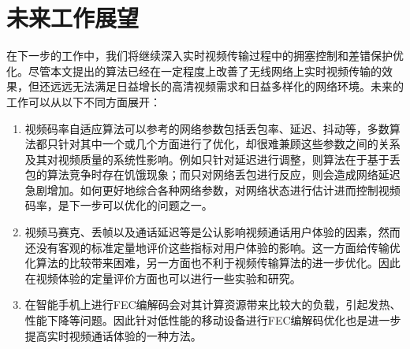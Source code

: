 \section{未来工作展望}
在下一步的工作中，我们将继续深入实时视频传输过程中的拥塞控制和差错保护优化。尽管本文提出的算法已经在一定程度上改善了无线网络上实时视频传输的效果，但还远远无法满足日益增长的高清视频需求和日益多样化的网络环境。未来的工作可以从以下不同方面展开：
\begin{enumerate}
    \item 视频码率自适应算法可以参考的网络参数包括丢包率、延迟、抖动等，多数算法都只针对其中一个或几个方面进行了优化，却很难兼顾这些参数之间的关系及其对视频质量的系统性影响。例如只针对延迟进行调整，则算法在于基于丢包的算法竞争时存在饥饿现象；而只对网络丢包进行反应，则会造成网络延迟急剧增加。如何更好地综合各种网络参数，对网络状态进行估计进而控制视频码率，是下一步可以优化的问题之一。
    \item 视频马赛克、丢帧以及通话延迟等是公认影响视频通话用户体验的因素，然而还没有客观的标准定量地评价这些指标对用户体验的影响。这一方面给传输优化算法的比较带来困难，另一方面也不利于视频传输算法的进一步优化。因此在视频体验的定量评价方面也可以进行一些实验和研究。
    \item 在智能手机上进行FEC编解码会对其计算资源带来比较大的负载，引起发热、性能下降等问题。因此针对低性能的移动设备进行FEC编解码优化也是进一步提高实时视频通话体验的一种方法。
\end{enumerate}
